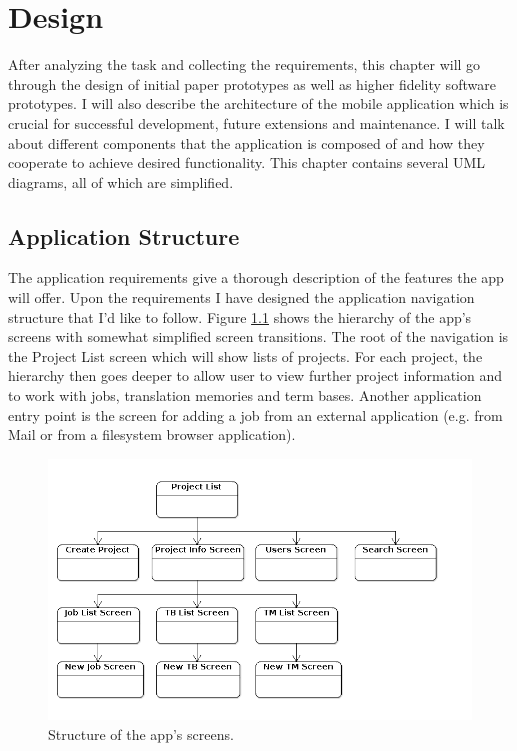 
\chapter{Design}

After analyzing the task and collecting the requirements, this chapter will go through the design of initial paper prototypes as well as higher fidelity software prototypes. I will also describe the architecture of the mobile application which is crucial for successful development, future extensions and maintenance. I will talk about different components that the application is composed of and how they cooperate to achieve desired functionality. This chapter contains several UML diagrams, all of which are simplified.

\section{Application Structure}

The application requirements give a thorough description of the features the app will offer. Upon the requirements I have designed the application navigation structure that I'd like to follow. Figure \ref{fig:structure} shows the hierarchy of the app's screens with somewhat simplified screen transitions. The root of the navigation is the Project List screen which will show lists of projects. For each project, the hierarchy then goes deeper to allow user to view further project information and to work with jobs, translation memories and term bases. Another application entry point is the screen for adding a job from an external application (e.g. from Mail or from a filesystem browser application).

\begin{figure}[]
	\includegraphics[width=1\textwidth]{argoUml/structure}
	\caption{Structure of the app's screens.}
	\label{fig:structure}
\end{figure}

